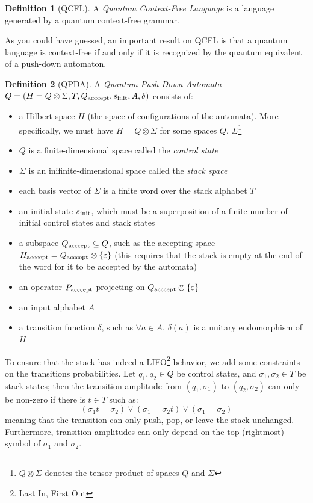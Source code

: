 \documentclass[12pt,a4paper]{article}
\theoremstyle{plain}
\theoremstyle{definition}
\newtheorem*{definition}{Definition}
\begin{document}
\begin{definition}[QCFL]
    A \emph{Quantum Context-Free Language} is a language generated by a quantum context-free grammar.
\end{definition}

As you could have guessed, an important result on QCFL is that a quantum language is context-free if and only if it is recognized by the quantum equivalent of a push-down automaton.

\begin{definition}[QPDA]
    A \emph{Quantum Push-Down Automata} $Q=(H=Q\otimes \Sigma, T, Q_{\textnormal{acccept}}, s_{\textnormal{init}}, A, \delta)$ consists of:
    \begin{itemize}[label=--, noitemsep]
        \item a Hilbert space $H$ (the space of configurations of the automata). More specifically, we must have $H=Q\otimes \Sigma$ for some spaces $Q$, $\Sigma$\footnote{$Q\otimes \Sigma$ denotes the tensor product of spaces $Q$ and $\Sigma$}
        \item $Q$ is a finite-dimensional space called the \emph{control state}
        \item $\Sigma$ is an inifinite-dimensional space called the \emph{stack space}
        \item each basis vector of $\Sigma$ is a finite word over the stack alphabet $T$
        \item an initial state $s_{\textnormal{init}}$, which must be a superposition of a finite number of initial control states and stack states
        \item a subspace $Q_{\textnormal{acccept}} \subseteq Q$, such as the accepting space $H_{\textnormal{acccept}}=Q_{\textnormal{acccept}}\otimes \{\varepsilon\}$ (this requires that the stack is empty at the end of the word for it to be accepted by the automata)
        \item an operator $P_{\textnormal{acccept}}$ projecting on $Q_{\textnormal{acccept}}\otimes \{\varepsilon\}$
        \item an input alphabet $A$
        \item a transition function $\delta$, such as $\forall a\in A$, $\delta(a)$ is a unitary endomorphism of $H$
    \end{itemize}

    To ensure that the stack has indeed a LIFO\footnote{Last In, First Out} behavior, we add some constraints on the transitions probabilities. Let $q_1, q_2\in Q$ be control states, and $\sigma_1, \sigma_2\in T$ be stack states; then the transition amplitude from $(q_1, \sigma_1)$ to $(q_2, \sigma_2)$ can only be non-zero if there is $t\in T$ such as:
    \begin{equation*}
        (\sigma_1t = \sigma_2) \lor (\sigma_1 = \sigma_2t) \lor (\sigma_1 = \sigma_2)
    \end{equation*}
    meaning that the transition can only push, pop, or leave the stack unchanged. Furthermore, transition amplitudes can only depend on the top (rightmost) symbol of $\sigma_1$ and $\sigma_2$.
\end{definition}
\end{document}
